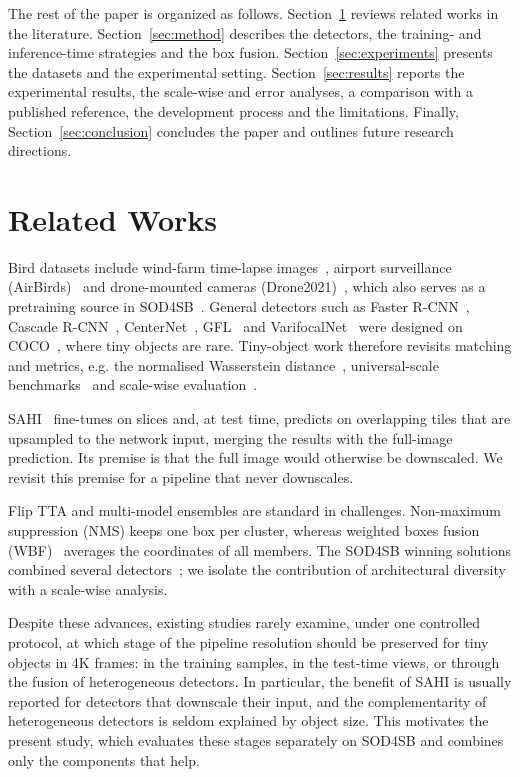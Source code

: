 \documentclass[conference]{IEEEtran}
\begin{document}
The rest of the paper is organized as follows. Section~\ref{sec:related} reviews related works in the literature.
Section~\ref{sec:method} describes the detectors, the training- and inference-time strategies and the box fusion.
Section~\ref{sec:experiments} presents the datasets and the experimental setting. Section~\ref{sec:results} reports the
experimental results, the scale-wise and error analyses, a comparison with a published reference, the development
process and the limitations. Finally, Section~\ref{sec:conclusion} concludes the paper and outlines future research
directions.

\section{Related Works}
\label{sec:related}
Bird datasets include wind-farm time-lapse images~\cite{yoshihashi2017windfarm}, airport surveillance
(AirBirds)~\cite{sun2022airbirds} and drone-mounted cameras (Drone2021)~\cite{fujii2021distant}, which also
serves as a pretraining source in SOD4SB~\cite{kondo2023sod4sb}. General detectors such as Faster
R-CNN~\cite{ren2015faster}, Cascade R-CNN~\cite{cai2018cascade}, CenterNet~\cite{zhou2019objects}, GFL~\cite{li2020gfl}
and VarifocalNet~\cite{zhang2021varifocalnet} were designed on COCO~\cite{lin2014coco}, where tiny objects are
rare. Tiny-object work therefore revisits matching and metrics, e.g. the normalised Wasserstein
distance~\cite{wang2021nwd}, universal-scale benchmarks~\cite{shinya2022usb} and scale-wise evaluation~\cite{shinya2023bandre}.

SAHI~\cite{akyon2022sahi} fine-tunes on slices and, at test time, predicts on overlapping tiles that are
upsampled to the network input, merging the results with the full-image prediction. Its premise is that the
full image would otherwise be downscaled. We revisit this premise for a pipeline that never downscales.

Flip TTA and multi-model ensembles are standard in challenges. Non-maximum suppression (NMS) keeps one box per
cluster, whereas weighted boxes fusion (WBF)~\cite{solovyev2021wbf} averages the coordinates of all members.
The SOD4SB winning solutions combined several detectors~\cite{kondo2023sod4sb,hou2023ensemble}; we isolate the
contribution of architectural diversity with a scale-wise analysis.

Despite these advances, existing studies rarely examine, under one controlled protocol, at which stage of the
pipeline resolution should be preserved for tiny objects in 4K frames: in the training samples, in the test-time
views, or through the fusion of heterogeneous detectors. In particular, the benefit of SAHI is usually reported for
detectors that downscale their input, and the complementarity of heterogeneous detectors is seldom
explained by object size. This motivates the present study, which evaluates these stages separately on SOD4SB and
combines only the components that help.
\end{document}
